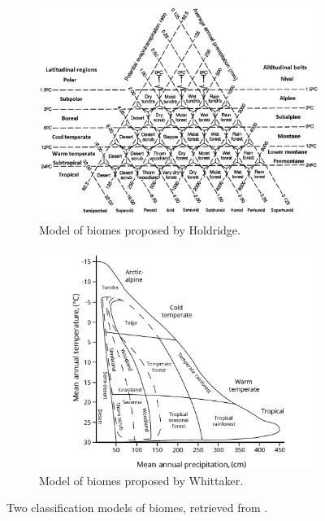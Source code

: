 \documentclass{article}
\begin{document}
\begin{figure}
    \centering
    \begin{subfigure}{0.45\linewidth}
        \includegraphics[width=\linewidth]{figures/biome_holdridge.png}
        \caption{Model of biomes proposed by Holdridge.}
        \label{fig:biome_holdridge}
    \end{subfigure}
    \hfill
    \begin{subfigure}{0.45\linewidth}
        \includegraphics[width=\linewidth]{figures/biome_whittaker.png}
        \caption{Model of biomes proposed by Whittaker.}
        \label{fig:biome_whittaker}
    \end{subfigure}

    \caption{Two classification models of biomes, retrieved from \cite{mucina_biome_2019}.}
    \label{fig:biome_schemes}
\end{figure}
\end{document}
